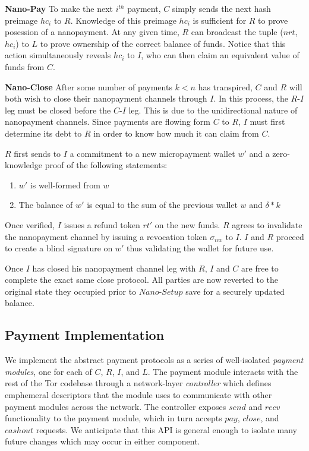 \textbf{Nano-Pay} To make the next $i^{th}$ payment, $C$ simply sends the next
hash preimage $hc_i$ to $R$. Knowledge of this preimage $hc_i$ is sufficient for
$R$ to prove posession of a nanopayment. At any given time, $R$ can broadcast
the tuple ($nrt$, $hc_i$) to $L$ to prove ownership of the correct balance of
funds. Notice that this action simultaneously reveals $hc_i$ to $I$, who can
then claim an equivalent value of funds from $C$.

\textbf{Nano-Close} After some number of payments $k < n$ has transpired, $C$ and $R$ will both wish
to close their nanopayment channels through $I$. In this process, the $R$-$I$ leg
must be closed before the $C$-$I$ leg. This is due to the unidirectional nature
of nanopayment channels. Since payments are flowing form $C$ to $R$, $I$ must
first determine its debt to $R$ in order to know how much it can claim from $C$.

$R$ first sends to $I$ a commitment to a new micropayment wallet $w'$ and a
zero-knowledge proof of the following statements:

\begin{enumerate}
\item $w'$ is well-formed from $w$
\item The balance of $w'$ is equal to the sum of the previous wallet $w$ and
  $\delta * k$
\end{enumerate}

Once verified, $I$ issues a refund token $rt'$ on the new funds. $R$ agrees to
invalidate the nanopayment channel by issuing a revocation token $\sigma_{nw}$
to $I$. $I$ and $R$ proceed to create a blind signature on $w'$ thus validating
the wallet for future use.

Once $I$ has closed his nanopayment channel leg with $R$, $I$ and $C$ are free
to complete the exact same close protocol. All parties are now reverted to the
original state they occupied prior to $Nano$-$Setup$ save for a securely updated
balance.

\subsection{Payment Implementation}

We implement the abstract payment protocols as a series of well-isolated
\emph{payment modules}, one for each of $C$, $R$, $I$, and $L$. The payment
module interacts with the rest of the Tor codebase through a network-layer
\emph{controller} which defines emphemeral descriptors that the module uses to
communicate with other payment modules across the network. The controller
exposes $send$ and $recv$ functionality to the payment module, which in turn
accepts $pay$, $close$, and $cashout$ requests. We anticipate that this API is
general enough to isolate many future changes which may occur in either
component.

